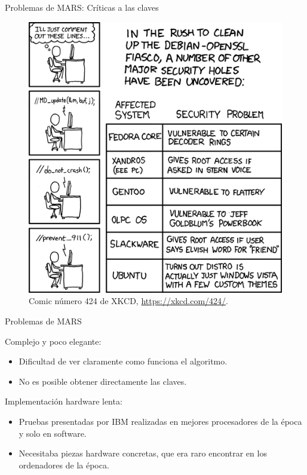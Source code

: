 \documentclass{beamer}
\begin{document}
\begin{frame}{Problemas de MARS: Críticas a las claves}

	\begin{figure}[H]
		\centering
		\includegraphics[scale = 0.38]{xkcd_424.png}
		\caption{Comic número 424 de XKCD, \url{https://xkcd.com/424/}.} \label{fig:xkcd_2}
	\end{figure}

\end{frame}


\begin{frame}{Problemas de MARS}

	Complejo y poco elegante:
	\begin{itemize}
		\item Dificultad de ver claramente como funciona el algoritmo.
		\item No es posible obtener directamente las claves.
	\end{itemize}

	Implementación hardware lenta:
	\begin{itemize}
		\item Pruebas presentadas por IBM realizadas en mejores procesadores de la época y solo en software.
		\item Necesitaba piezas hardware concretas, que era raro encontrar en los ordenadores de la época.
	\end{itemize}


\end{frame}
\end{document}
